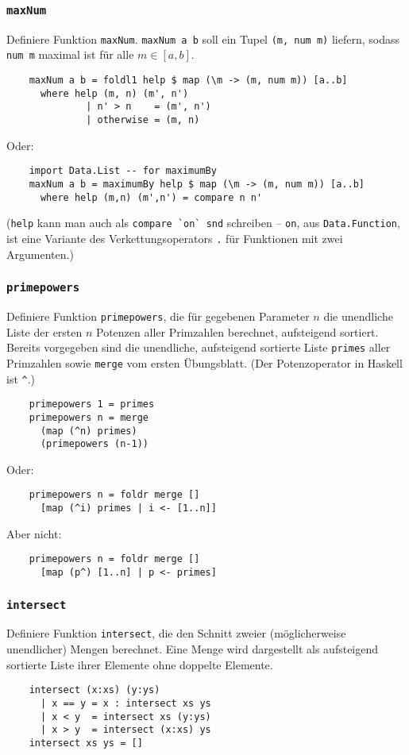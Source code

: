 \documentclass{beamer}
\begin{document}
\begin{frame}[fragile]
  \frametitle{\lstinline{maxNum}}
  Definiere Funktion \lstinline{maxNum}.
  \lstinline{maxNum a b} soll ein Tupel \lstinline{(m, num m)} liefern, sodass \lstinline{num m} maximal ist für alle $m ∈ [a,b]$.
  \pause
  \begin{lstlisting}
    maxNum a b = foldl1 help $ map (\m -> (m, num m)) [a..b]
      where help (m, n) (m', n')
              | n' > n    = (m', n')
              | otherwise = (m, n)
  \end{lstlisting}
  Oder:
  \begin{lstlisting}
    import Data.List -- for maximumBy
    maxNum a b = maximumBy help $ map (\m -> (m, num m)) [a..b]
      where help (m,n) (m',n') = compare n n'
  \end{lstlisting}
  (\lstinline{help} kann man auch als \lstinline{compare `on` snd} schreiben – \lstinline{on}, aus \lstinline{Data.Function}, ist eine Variante des Verkettungsoperators \lstinline{.} für Funktionen mit zwei Argumenten.)
\end{frame}

\begin{frame}[fragile]
  \frametitle{\lstinline{primepowers}}
  Definiere Funktion \lstinline{primepowers}, die für gegebenen Parameter $n$ die unendliche Liste der ersten $n$ Potenzen aller Primzahlen berechnet, aufsteigend sortiert.
  Bereits vorgegeben sind die unendliche, aufsteigend sortierte Liste \lstinline{primes} aller Primzahlen sowie \lstinline{merge} vom ersten Übungsblatt.
  (Der Potenzoperator in Haskell ist \lstinline{^}.)
  \pause
  \begin{lstlisting}
    primepowers 1 = primes
    primepowers n = merge
      (map (^n) primes)
      (primepowers (n-1))
  \end{lstlisting}
  Oder:
  \begin{lstlisting}
    primepowers n = foldr merge []
      [map (^i) primes | i <- [1..n]]
  \end{lstlisting}
  Aber nicht:
  \begin{lstlisting}
    primepowers n = foldr merge []
      [map (p^) [1..n] | p <- primes]
  \end{lstlisting}
\end{frame}

\begin{frame}[fragile]
  \frametitle{\lstinline{intersect}}
  Definiere Funktion \lstinline{intersect}, die den Schnitt zweier (möglicherweise unendlicher) Mengen berechnet.
  Eine Menge wird dargestellt als aufsteigend sortierte Liste ihrer Elemente ohne doppelte Elemente.
  \pause
  \begin{lstlisting}
    intersect (x:xs) (y:ys)
      | x == y = x : intersect xs ys
      | x < y  = intersect xs (y:ys)
      | x > y  = intersect (x:xs) ys
    intersect xs ys = []
  \end{lstlisting}
\end{frame}
\end{document}
